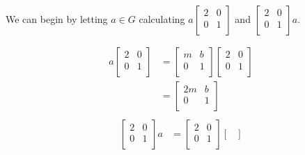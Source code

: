 \begin{mdframed}[style=darkAnswer,frametitle={Joe Starr}]
We can begin by letting $a\in G$ calculating $a\begin{bmatrix}
  2 & 0 \\
  0 & 1 \\
  \end{bmatrix}$ and $\begin{bmatrix}
  2 & 0 \\
  0 & 1 \\
  \end{bmatrix}a$.
\begin{multicols}{2}
\begin{align*}
a\begin{bmatrix}
2             & 0                 \\
0             & 1                 \\
\end{bmatrix} & = \begin{bmatrix}
m             & b                 \\
0             & 1                 \\
\end{bmatrix} \begin{bmatrix}
2             & 0                 \\
0             & 1                 \\
\end{bmatrix} \\
& = \begin{bmatrix}
2m            & b                 \\
0             & 1                 \\
\end{bmatrix}                            \\
\end{align*}
\begin{align*}
\begin{bmatrix}
2              & 0                  \\
0              & 1                  \\
\end{bmatrix}a & =  \begin{bmatrix}
2              & 0                  \\
0              & 1                  \\
\end{bmatrix} \begin{bmatrix}

\end{bmatrix}
\end{align*}
\end{multicols}
\end{mdframed}
